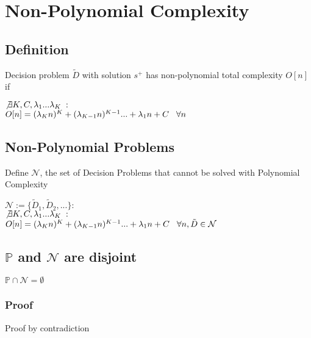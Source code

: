 \documentclass[11pt]{article}
\begin{document}
\newpage
\section{Non-Polynomial Complexity}
\subsection{Definition}
Decision problem $\tilde{D}$ with solution $s^+$ has non-polynomial total complexity $O[n]$ if
\begin{center}
$\not \exists K,C,\lambda_1...\lambda_K \hspace{1mm} :$
\\ \vspace{2mm}
$O[n] = (\lambda_K n)^K + (\lambda_{K-1} n)^{K-1}... + \lambda_1 n + C \hspace{3mm} \forall n$
\end{center}


\subsection{Non-Polynomial Problems}
Define $\mathcal{N}$, the set of Decision Problems that cannot be solved with Polynomial Complexity
\begin{center}
$
\mathcal{N} := \{\tilde{D}_1,\tilde{D}_2,...\} :
$
\\ \vspace{2mm}
$\not \exists K,C,\lambda_1...\lambda_K \hspace{1mm} :$
\\ \vspace{2mm}
$O[n] = (\lambda_K n)^K + (\lambda_{K-1} n)^{K-1}... + \lambda_1 n + C \hspace{3mm} \forall n,\tilde{D} \in \mathcal{N}$
\end{center}

\subsection{$\mathbb{P}$ and $\mathcal{N}$ are disjoint}
\begin{center}
\vspace{2mm}
$
\mathbb{P} \cap \mathcal{N} = \emptyset
$
\end{center}

\subsubsection{Proof}
Proof by contradiction
\end{document}
